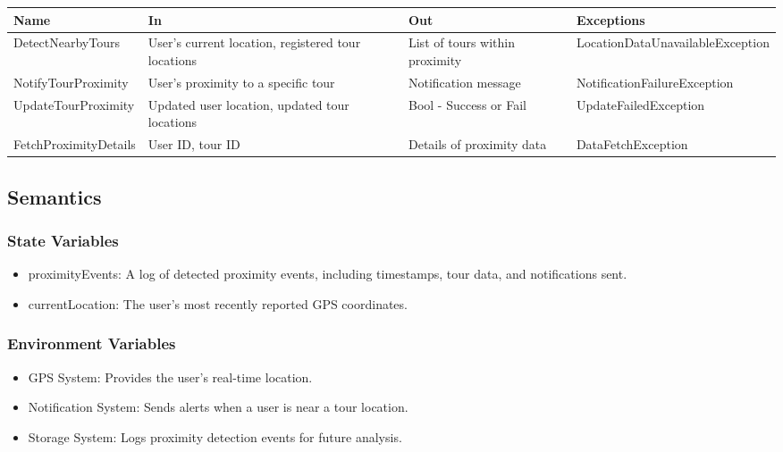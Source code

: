 \documentclass[12pt, titlepage]{article}
\begin{document}
\begin{center}
  \begin{tabular}{p{4cm} p{3cm} p{3cm} p{5cm}}
    \hline
    \textbf{Name}         & \textbf{In}                                        & \textbf{Out}                   & \textbf{Exceptions}              \\
    \hline
    DetectNearbyTours     & User’s current location, registered tour locations & List of tours within proximity & LocationDataUnavailableException \\
    \hline
    NotifyTourProximity   & User’s proximity to a specific tour                & Notification message           & NotificationFailureException     \\
    \hline
    UpdateTourProximity   & Updated user location, updated tour locations      & Bool - Success or Fail         & UpdateFailedException            \\
    \hline
    FetchProximityDetails & User ID, tour ID                                   & Details of proximity data      & DataFetchException               \\
    \hline
  \end{tabular}
\end{center}


\subsection{Semantics}

\subsubsection{State Variables}

\begin{itemize}
  \item proximityEvents: A log of detected proximity events, including timestamps, tour data, and notifications sent.
  \item currentLocation: The user's most recently reported GPS coordinates.
\end{itemize}

\subsubsection{Environment Variables}

\begin{itemize}
  \item GPS System: Provides the user's real-time location.
  \item Notification System: Sends alerts when a user is near a tour location.
  \item Storage System: Logs proximity detection events for future analysis.
\end{itemize}
\end{document}
